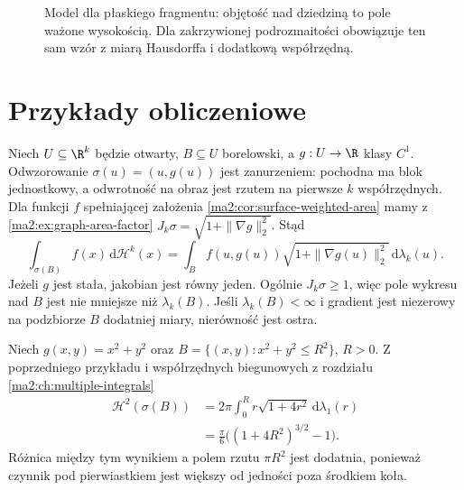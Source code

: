 \begin{figure}[htbp]
\centering
{}
\caption{Model dla płaskiego fragmentu: objętość
nad dziedziną to pole ważone wysokością.
Dla zakrzywionej podrozmaitości obowiązuje
ten sam wzór z miarą Hausdorffa i dodatkową
współrzędną.}
\label{ma2:fig:surface-weighted-volume}
\end{figure}

\section{Przykłady obliczeniowe}

\begin{przyklad}
\label{ma2:ex:surface-graph}
Niech $U\subseteq\R^k$ będzie otwarty, $B\subseteq U$
borelowski, a $g:U\to\R$ klasy $C^1$.
Odwzorowanie $\sigma(u)=(u,g(u))$ jest zanurzeniem:
pochodna ma blok jednostkowy, a odwrotność
na obraz jest rzutem na pierwsze $k$ współrzędnych.
Dla funkcji $f$ spełniającej założenia
\ref{ma2:cor:surface-weighted-area} mamy z
\ref{ma2:ex:graph-area-factor}
$J_k\sigma=\sqrt{1+\|\nabla g\|_2^2}$.
Stąd
\[
 \int_{\sigma(B)} f(x)\,\mathrm d\mathcal H^k(x)
 =\int_B f(u,g(u))\sqrt{1+\|\nabla g(u)\|_2^2}
 \,\mathrm d\lambda_k(u).
\]
Jeżeli $g$ jest stała, jakobian jest równy jeden.
Ogólnie $J_k\sigma\ge1$, więc pole wykresu
nad $B$ jest nie mniejsze niż $\lambda_k(B)$.
Jeśli $\lambda_k(B)<\infty$ i gradient jest
niezerowy na podzbiorze $B$ dodatniej miary,
nierówność jest ostra.
\end{przyklad}

\begin{przyklad}
\label{ma2:ex:surface-paraboloid}
Niech $g(x,y)=x^2+y^2$ oraz $B=\{(x,y):x^2+y^2\le R^2\}$,
$R>0$. Z poprzedniego przykładu
i współrzędnych biegunowych z rozdziału
\ref{ma2:ch:multiple-integrals}
\[
 \begin{aligned}
 \mathcal H^2(\sigma(B))
 &=2\pi\int_0^R r\sqrt{1+4r^2}\,\mathrm d\lambda_1(r)\\
 &=\frac{\pi}{6}\big((1+4R^2)^{3/2}-1\big).
 \end{aligned}
\]
Różnica między tym wynikiem a polem rzutu $\pi R^2$
jest dodatnia, ponieważ czynnik pod pierwiastkiem
jest większy od jedności poza środkiem koła.
\end{przyklad}


